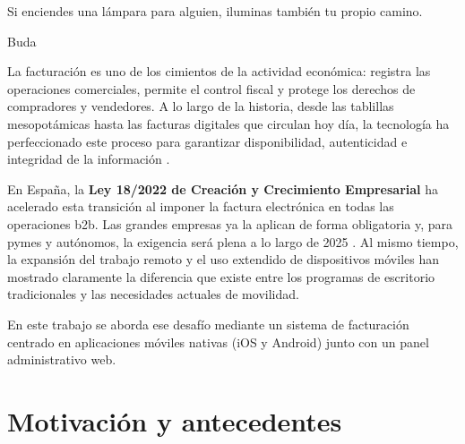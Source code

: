 \epigraph{Si enciendes una lámpara para alguien, iluminas también tu propio camino.}{Buda}

\begin{large}
  
La facturación es uno de los cimientos de la actividad económica: registra las operaciones comerciales, permite el control fiscal y protege los derechos de compradores y vendedores. A lo largo de la historia, desde las tablillas mesopotámicas hasta las facturas digitales que circulan hoy día, la tecnología ha perfeccionado este proceso para garantizar disponibilidad, autenticidad e integridad de la información \cite{origen_facturas}.

En España, la \textbf{Ley 18/2022 de Creación y Crecimiento Empresarial} ha acelerado esta transición al imponer la factura electrónica en todas las operaciones \gls{b2b}. Las grandes empresas ya la aplican de forma obligatoria y, para pymes y autónomos, la exigencia será plena a lo largo de 2025 \cite{ley18_2022}. Al mismo tiempo, la expansión del trabajo remoto y el uso extendido de dispositivos móviles han mostrado claramente la diferencia que existe entre los programas de escritorio tradicionales y las necesidades actuales de movilidad.

En este trabajo se aborda ese desafío mediante un sistema de facturación centrado en aplicaciones móviles nativas (iOS y Android) junto con un panel administrativo web.

\end{large}

\section{Motivación y antecedentes}

